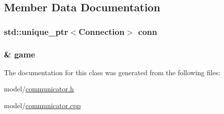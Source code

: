 \subsection{Member Data Documentation}
\subsubsection[{\texorpdfstring{conn}{conn}}]{\setlength{\rightskip}{0pt plus 5cm}std\+::unique\+\_\+ptr$<${\bf Connection}$>$ conn\hspace{0.3cm}{\ttfamily [private]}}\hypertarget{classMODEL_1_1Communicator_a74211040c2e2fd8475ce5f579c906171}{}\label{classMODEL_1_1Communicator_a74211040c2e2fd8475ce5f579c906171}
\subsubsection[{\texorpdfstring{game}{game}}]{\& game\hspace{0.3cm}{\ttfamily [private]}}\hypertarget{classMODEL_1_1Communicator_a1018ef7ed7f7714ef648545d209b9ff4}{}\label{classMODEL_1_1Communicator_a1018ef7ed7f7714ef648545d209b9ff4}


The documentation for this class was generated from the following files\+:\begin{DoxyCompactItemize}
\item 
model/\hyperlink{communicator_8h}{communicator.\+h}\item 
model/\hyperlink{communicator_8cpp}{communicator.\+cpp}\end{DoxyCompactItemize}
